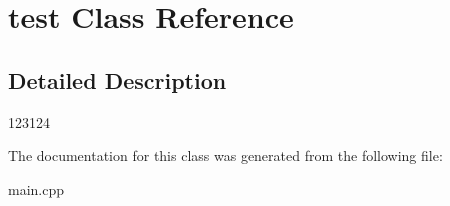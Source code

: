 \hypertarget{classtest}{}\section{test Class Reference}
\label{classtest}


\subsection{Detailed Description}
123124 

The documentation for this class was generated from the following file\+:\begin{DoxyCompactItemize}
\item 
main.\+cpp\end{DoxyCompactItemize}
